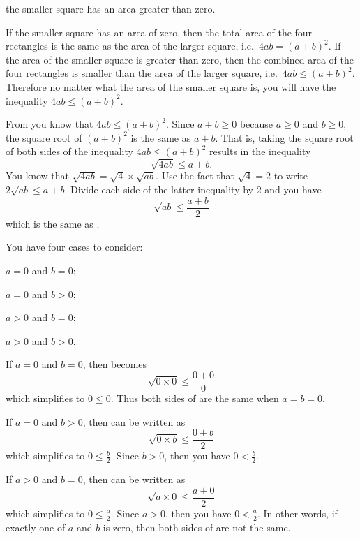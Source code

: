 \documentclass[a4paper,oneside,12pt]{article}
\begin{document}
\begin{problem}
{\begin{solution}
\begin{packedenumeral}
\item the smaller square has an area greater than zero.
\end{packedenumeral}
If the smaller square has an area of zero, then the total area of the
four rectangles is the same as the area of the larger square,
i.e.~$4ab = (a + b)^2$.  If the area of the smaller square is greater
than zero, then the combined area of the four rectangles is smaller
than the area of the larger square, i.e.~$4ab \leq (a + b)^2$.
Therefore no matter what the area of the smaller square is, you will
have the inequality $4ab \leq (a + b)^2$.

From  you know that $4ab \leq (a + b)^2$.
Since $a + b \geq 0$ because $a \geq 0$ and $b \geq 0$, the square
root of $(a + b)^2$ is the same as $a + b$.  That is, taking the
square root of both sides of the inequality $4ab \leq (a + b)^2$
results in the inequality
\[
\sqrt{4ab}
\leq
a + b.
\]
You know that $\sqrt{4ab} = \sqrt{4} \times \sqrt{ab}$.  Use the fact
that $\sqrt{4} = 2$ to write $2\sqrt{ab} \leq a + b$.  Divide each
side of the latter inequality by $2$ and you have
\[
\sqrt{ab}
\leq
\frac{a + b}{2}
\]
which is the same as .

You have four cases to consider:
\begin{packedenumeral}
\item $a = 0$ and $b = 0$;

\item $a = 0$ and $b > 0$;

\item $a > 0$ and $b = 0$;

\item $a > 0$ and $b > 0$.
\end{packedenumeral}
If $a = 0$ and $b = 0$, then  becomes
\[
\sqrt{0 \times 0}
\leq
\frac{0 + 0}{0}
\]
which simplifies to $0 \leq 0$.  Thus both sides of
 are the same when $a = b = 0$.

If $a = 0$ and $b > 0$, then  can be
written as
\[
\sqrt{0 \times b}
\leq
\frac{0 + b}{2}
\]
which simplifies to $0 \leq \frac{b}{2}$.  Since $b > 0$, then you
have $0 < \frac{b}{2}$.

If $a > 0$ and $b = 0$, then  can be
written as
\[
\sqrt{a \times 0}
\leq
\frac{a + 0}{2}
\]
which simplifies to $0 \leq \frac{a}{2}$.  Since $a > 0$, then you
have $0 < \frac{a}{2}$.  In other words, if exactly one of $a$ and $b$
is zero, then both sides of  are not
the same.


\end{solution}}
\end{problem}
\end{document}
